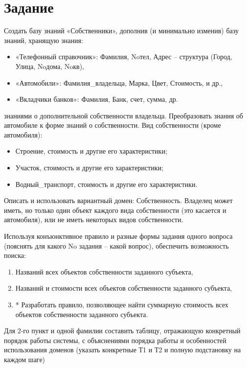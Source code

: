 \documentclass[12pt]{report}
\begin{document}
\section*{Задание}
Создать базу знаний «Собственники», дополнив (и минимально изменив) базу знаний, хранящую знания:
\begin{itemize}
    \item «Телефонный справочник»: Фамилия, Noтел, Адрес – структура (Город, Улица, Noдома, Noкв),
    \item «Автомобили»: Фамилия\_владельца, Марка, Цвет, Стоимость, и др.,
    \item «Вкладчики банков»: Фамилия, Банк, счет, сумма, др.
\end{itemize}
знаниями о дополнительной собственности владельца. Преобразовать знания об автомобиле к форме знаний о собственности. Вид собственности (кроме автомобиля):
\begin{itemize}
    \item Строение, стоимость и другие его характеристики;
    \item Участок, стоимость и другие его характеристики;
    \item Водный\_транспорт, стоимость и другие его характеристики.
\end{itemize}

Описать и использовать вариантный домен: Собственность. Владелец может иметь, но только один объект каждого вида собственности (это касается и автомобиля), или не иметь некоторых видов собственности.

Используя конъюнктивное правило и разные формы задания одного вопроса (пояснять для какого No задания – какой вопрос), обеспечить возможность поиска:
\begin{enumerate}
    \item Названий всех объектов собственности заданного субъекта,
    \item Названий и стоимости всех объектов собственности заданного субъекта,
    \item * Разработать правило, позволяющее найти суммарную стоимость всех
объектов собственности заданного субъекта.
\end{enumerate}

Для 2-го пункт и одной фамилии составить таблицу, отражающую конкретный
порядок работы системы, с объяснениями порядка работы и особенностей использования доменов (указать конкретные Т1 и Т2 и полную подстановку на каждом шаге)
\end{document}
